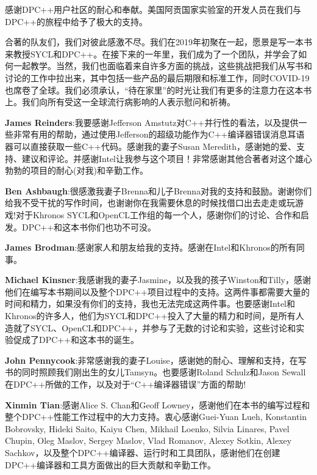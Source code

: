 感谢DPC++用户社区的耐心和奉献。美国阿贡国家实验室的开发人员在我们与DPC++的旅程中给予了极大的支持。\par

合著的队友们，我们对彼此感激不尽。我们在2019年初聚在一起，愿景是写一本书来教授SYCL和DPC++。在接下来的一年里，我们成为了一个团队，并学会了如何一起教学。当然，我们也面临着来自许多方面的挑战，这些挑战把我们从写书和讨论的工作中拉出来，其中包括一些产品的最后期限和标准工作，同时COVID-19也席卷了全球。我们必须承认，“待在家里”的时光让我们有更多的注意力在这本书上。我们向所有受这一全球流行病影响的人表示慰问和祈祷。\par

\textbf{James Reinders}:我要感谢Jefferson Amstutz对C++并行性的看法，以及提供一些非常有用的帮助，通过使用Jefferson的超级功能作为C++编译器错误消息耳语器可以直接获取一些C++代码。感谢我的妻子Susan Meredith，感谢她的爱、支持、建议和评论。并感谢Intel让我参与这个项目！非常感谢其他合著者对这个雄心勃勃的项目的耐心(对我)和辛勤工作。\par

\textbf{Ben Ashbaugh}:很感激我妻子Brenna和儿子Brenna对我的支持和鼓励。谢谢你们给我不受干扰的写作时间，也谢谢你在我需要休息的时候找借口出去走走或玩游戏!对于Khronos SYCL和OpenCL工作组的每一个人，感谢你们的讨论、合作和启发。DPC++和这本书你们也功不可没。\par

\textbf{James Brodman}:感谢家人和朋友给我的支持。感谢在Intel和Khronos的所有同事。\par

\textbf{Michael Kinsner}:我感谢我的妻子Jasmine，以及我的孩子Winston和Tilly，感谢他们在编写本书期间以及整个DPC++项目过程中的支持。这两件事都需要大量的时间和精力，如果没有你们的支持，我也无法完成这两件事。也要感谢Intel和Khronos的许多人，他们为SYCL和DPC++投入了大量的精力和时间，是所有人造就了SYCL、OpenCL和DPC++，并参与了无数的讨论和实验，这些讨论和实验促成了DPC++和这本书的诞生。\par

\textbf{John Pennycook}:非常感谢我的妻子Louise，感谢她的耐心、理解和支持，在写书的同时照顾我们刚出生的女儿Tamsyn。也要感谢Roland Schulz和Jason Sewall在DPC++所做的工作，以及对于“C++编译器错误”方面的帮助!\par

\textbf{Xinmin Tian}:感谢Alice S. Chan和Geoff Lowney，感谢他们在本书的编写过程和整个DPC++性能工作过程中的大力支持。衷心感谢Guei-Yuan Lueh, Konstantin Bobrovsky, Hideki Saito, Kaiyu Chen, Mikhail Loenko, Silvia Linares, Pavel Chupin, Oleg Maslov, Sergey Maslov, Vlad Romanov, Alexey Sotkin, Alexey Sachkov，以及整个DPC++编译器、运行时和工具团队，感谢他们在创建DPC++编译器和工具方面做出的巨大贡献和辛勤工作。\par


